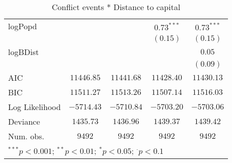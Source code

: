 \begin{sidewaystable}
\begin{center}
{\begin{tabular}{l c c c c}
logPopd              &                &                & $0.73^{***}$  & $0.73^{***}$  \\
                     &                &                & $(0.15)$      & $(0.15)$      \\
logBDist             &                &                &               & $0.05$        \\
                     &                &                &               & $(0.09)$      \\
\midrule
AIC                  & $11446.85$     & $11441.68$     & $11428.40$    & $11430.13$    \\
BIC                  & $11511.27$     & $11513.26$     & $11507.14$    & $11516.03$    \\
Log Likelihood       & $-5714.43$     & $-5710.84$     & $-5703.20$    & $-5703.06$    \\
Deviance             & $1435.73$      & $1436.96$      & $1439.37$     & $1439.42$     \\
Num. obs.            & $9492$         & $9492$         & $9492$        & $9492$        \\
\bottomrule
\multicolumn{5}{l}{\scriptsize{$^{***}p<0.001$; $^{**}p<0.01$; $^{*}p<0.05$; $^{\cdot}p<0.1$}}
\end{tabular}
}
\caption{Conflict events *
		  Distance to capital}
\label{interaction_both}
\end{center}
\end{sidewaystable}
